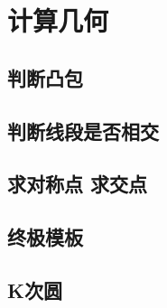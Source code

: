 \documentclass[main.tex]{subfiles}
\begin{document}
\chapter{计算几何}
    \section{判断凸包}
    
    \section{判断线段是否相交}
    
    \section{求对称点 求交点}
    
    \section{终极模板}
    
    \section{K次圆}
    
\end{document}
